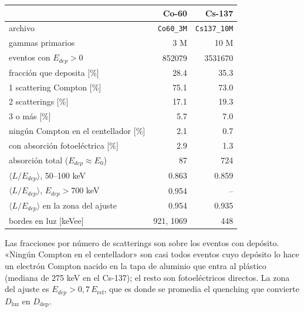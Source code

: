 \begin{tabular}{lrr}
\toprule
\textbf{} & \textbf{Co-60} & \textbf{Cs-137} \\
\midrule
archivo & \texttt{Co60\_3M} & \texttt{Cs137\_10M} \\
gammas primarios & 3 M & 10 M \\
eventos con $E_{dep} > 0$ & 852079 & 3531670 \\
fracción que deposita [\%] & 28.4 & 35.3 \\
\midrule
1 scattering Compton [\%] & 75.1 & 73.0 \\
2 scatterings [\%] & 17.1 & 19.3 \\
3 o más [\%] & 5.7 & 7.0 \\
ningún Compton en el centellador [\%] & 2.1 & 0.7 \\
con absorción fotoeléctrica [\%] & 2.9 & 1.3 \\
absorción total ($E_{dep} \approx E_0$) & 87 & 724 \\
\midrule
$\langle L/E_{dep}\rangle$, 50--100 keV & 0.863 & 0.859 \\
$\langle L/E_{dep}\rangle$, $E_{dep} > 700$ keV & 0.954 & -- \\
$\langle L/E_{dep}\rangle$ en la zona del ajuste & 0.954 & 0.935 \\
bordes en luz [keVee] & 921, 1069 & 448 \\
\bottomrule
\end{tabular}
\par\smallskip
\begin{minipage}{0.95\linewidth}\footnotesize Las fracciones por número de scatterings son sobre los eventos con depósito. «Ningún Compton en el centellador» son casi todos eventos cuyo depósito lo hace un electrón Compton nacido en la tapa de aluminio que entra al plástico (mediana de 275 keV en el Cs-137); el resto son fotoeléctricos directos. La zona del ajuste es $E_{dep} > 0{,}7\,E_{\text{ref}}$, que es donde se promedia el quenching que convierte $D_{\text{luz}}$ en $D_{\text{dep}}$.\end{minipage}
